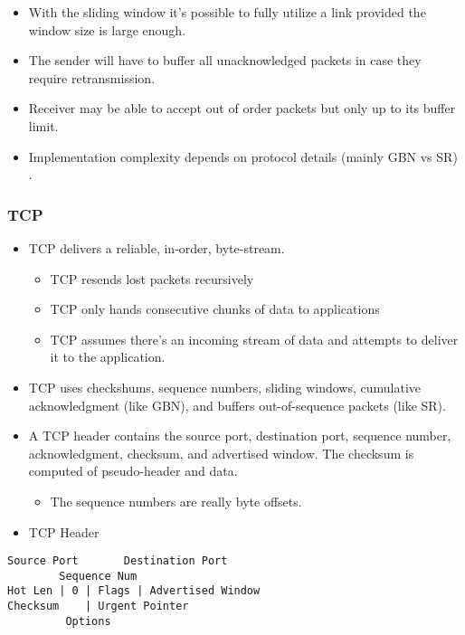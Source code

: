 \begin{itemize}
  \begin{itemize}
  \tightlist
  \item
    With the sliding window it's possible to fully utilize a link
    provided the window size is large enough.
  \item
    The sender will have to buffer all unacknowledged packets in case
    they require retransmission.
  \item
    Receiver may be able to accept out of order packets but only up to
    its buffer limit.
  \item
    Implementation complexity depends on protocol details (mainly GBN vs
    SR) .
  \end{itemize}
\end{itemize}

\hypertarget{tcp}{%
\subsubsection{TCP}\label{tcp}}

\begin{itemize}
\tightlist
\item
  TCP delivers a reliable, in-order, byte-stream.

  \begin{itemize}
  \tightlist
  \item
    TCP resends lost packets recursively
  \item
    TCP only hands consecutive chunks of data to applications
  \item
    TCP assumes there's an incoming stream of data and attempts to
    deliver it to the application.
  \end{itemize}
\item
  TCP uses checkshums, sequence numbers, sliding windows, cumulative
  acknowledgment (like GBN), and buffers out-of-sequence packets (like
  SR).
\item
  A TCP header contains the source port, destination port, sequence
  number, acknowledgment, checksum, and advertised window. The checksum
  is computed of pseudo-header and data.

  \begin{itemize}
  \tightlist
  \item
    The sequence numbers are really byte offsets.
  \end{itemize}
\item
  TCP Header
\end{itemize}

\begin{verbatim}
Source Port       Destination Port 
        Sequence Num
Hot Len | 0 | Flags | Advertised Window 
Checksum    | Urgent Pointer 
         Options
\end{verbatim}


